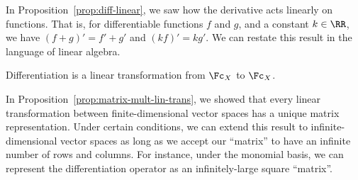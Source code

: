 In Proposition~\ref{prop:diff-linear}, we saw how the derivative acts linearly on functions. That is, for differentiable functions $f$ and $g$, and a constant $k \in \RR$, we have $(f+g)' = f' + g'$ and $(kf)' = kg'$. We can restate this result in the language of linear algebra.

\begin{proposition}\label{prop:diff-lin-trans}
    Differentiation is a linear transformation from $\Fc_X$ to $\Fc_X$.
\end{proposition}

In Proposition~\ref{prop:matrix-mult-lin-trans}, we showed that every linear transformation between finite-dimensional vector spaces has a unique matrix representation. Under certain conditions, we can extend this result to infinite-dimensional vector spaces as long as we accept our ``matrix'' to  have an infinite number of rows and columns. For instance, under the monomial basis, we can represent the differentiation operator as an infinitely-large square ``matrix''.

